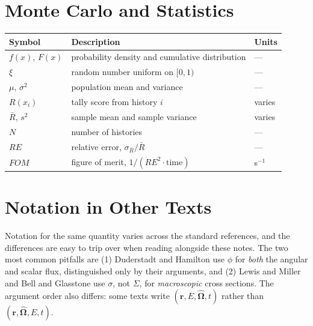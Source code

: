 \section*{Monte Carlo and Statistics}

\begin{center}
 {\small
 \begin{tabular*}{0.95\textwidth}{@{\extracolsep{\fill}} lll }
  \toprule
   Symbol                                        & Description                   & Units  \\
  \midrule
   $f(x)$, $F(x)$                                & probability density and cumulative distribution & --- \\
   $\xi$                                         & random number uniform on $[0,1)$ & --- \\
   $\mu$, $\sigma^2$                             & population mean and variance  & --- \\
   $R(x_i)$                                      & tally score from history $i$  & varies \\
   $\bar{R}$, $s^2$                              & sample mean and sample variance & varies \\
   $N$                                           & number of histories           & --- \\
   $RE$                                          & relative error, $\sigma_{\bar{R}}/\bar{R}$ & --- \\
   $FOM$                                         & figure of merit, $1/(RE^2 \cdot \text{time})$ & s$^{-1}$ \\
  \bottomrule
 \end{tabular*}
 }
\end{center}

\section*{Notation in Other Texts}

Notation for the same quantity varies across the standard references, and the differences are easy to trip over when reading alongside these notes.  The two most common pitfalls are (1) Duderstadt and Hamilton use $\phi$ for \emph{both} the angular and scalar flux, distinguished only by their arguments, and (2) Lewis and Miller and Bell and Glasstone use $\sigma$, not $\Sigma$, for \emph{macroscopic} cross sections.  The argument order also differs: some texts write $(\mathbf{r},E,\hat{\bm{\Omega}},t)$ rather than $(\mathbf{r},\hat{\bm{\Omega}},E,t)$.

